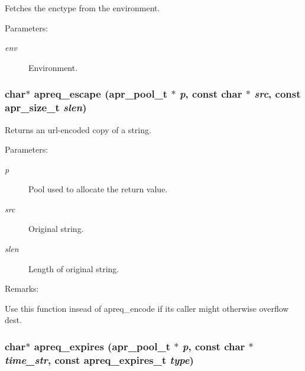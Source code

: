 Fetches the enctype from the environment. \begin{Desc}
\item[Parameters: ]\par
\begin{description}
\item[{\em 
env}]Environment. \end{description}
\end{Desc}
\subsubsection{\setlength{\rightskip}{0pt plus 5cm}char$\ast$ apreq\_\-escape ({\bf apr\_\-pool\_\-t} $\ast$ {\em p}, const char $\ast$ {\em src}, const {\bf apr\_\-size\_\-t} {\em slen})}\label{group__Utils_a14}


Returns an url-encoded copy of a string. \begin{Desc}
\item[Parameters: ]\par
\begin{description}
\item[{\em 
p}]Pool used to allocate the return value. \item[{\em 
src}]Original string. \item[{\em 
slen}]Length of original string. \end{description}
\end{Desc}
\begin{Desc}
\item[Remarks: ]\par
Use this function insead of apreq\_\-encode if its caller might otherwise overflow dest. \end{Desc}
\subsubsection{\setlength{\rightskip}{0pt plus 5cm}char$\ast$ apreq\_\-expires ({\bf apr\_\-pool\_\-t} $\ast$ {\em p}, const char $\ast$ {\em time\_\-str}, const {\bf apreq\_\-expires\_\-t} {\em type})}\label{group__Utils_a16}


